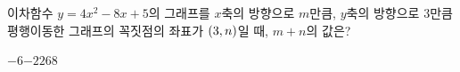 \hspace*{2mm}\begin{minipage}[t]{\dimexpr\linewidth-2mm\relax}\vspace{0pt}
이차함수 $y=4x^2-8x+5$의 그래프를 $x$축의 방향으로 $m$만큼, $y$축의 방향으로 $3$만큼 평행이동한 그래프의 꼭짓점의 좌표가 $(3{,}\mkern3mu n)$일 때, $m+n$의 값은?
\begin{choices32}{$-6$}{$-2$}{$2$}{$6$}{$8$}\end{choices32}\end{minipage}
